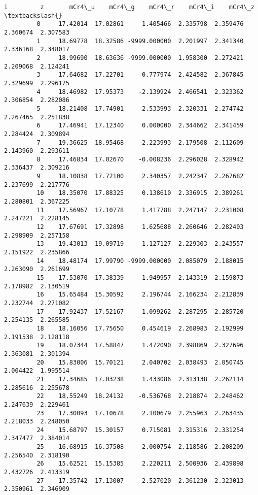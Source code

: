 \documentclass[11pt]{article}
\begin{document}
\begin{Verbatim}[commandchars=\\\{\}]
                      i         z       mCr4\_u    mCr4\_g    mCr4\_r    mCr4\_i    mCr4\_z  \textbackslash{}
         0     17.42014  17.02861     1.405466  2.335798  2.359476  2.360674  2.307583   
         1     18.69778  18.32586 -9999.000000  2.201997  2.341340  2.336168  2.348017   
         2     18.99690  18.63636 -9999.000000  1.958300  2.272421  2.209068  2.124241   
         3     17.64682  17.22701     0.777974  2.424582  2.367845  2.329699  2.296175   
         4     18.46982  17.95373    -2.139924  2.466541  2.323362  2.306854  2.282086   
         5     18.21408  17.74901     2.533993  2.320331  2.274742  2.267465  2.251838   
         6     17.46941  17.12340     0.000000  2.344662  2.341459  2.284424  2.309894   
         7     19.36625  18.95468     2.223993  2.179508  2.112609  2.143960  2.293611   
         8     17.46834  17.02670    -0.008236  2.296028  2.328942  2.336437  2.309216   
         9     18.10838  17.72100     2.340357  2.242347  2.267682  2.237699  2.217776   
         10    18.35070  17.88325     0.138610  2.336915  2.389261  2.280801  2.367225   
         11    17.56967  17.10778     1.417788  2.247147  2.231008  2.247221  2.228145   
         12    17.67691  17.32898     1.625688  2.260646  2.282403  2.298909  2.257158   
         13    19.43013  19.09719     1.127127  2.229303  2.243557  2.151922  2.235866   
         14    18.48174  17.99790 -9999.000000  2.085079  2.188015  2.263090  2.261699   
         15    17.53070  17.38339     1.949957  2.143319  2.159873  2.178982  2.130519   
         16    15.65484  15.30592     2.196744  2.166234  2.212839  2.232744  2.271082   
         17    17.92437  17.52167     1.099262  2.287295  2.285720  2.254135  2.265585   
         18    18.16056  17.75650     0.454619  2.268983  2.192999  2.191538  2.128118   
         19    18.07344  17.58847     1.472090  2.398869  2.327696  2.363081  2.301394   
         20    15.83006  15.70121     2.040702  2.038493  2.050745  2.004422  1.995514   
         21    17.34685  17.03238     1.433086  2.313138  2.262114  2.285616  2.255678   
         22    18.55249  18.24132    -0.536768  2.218874  2.248462  2.247639  2.229461   
         23    17.30093  17.10678     2.100679  2.255963  2.263435  2.218033  2.248050   
         24    15.68797  15.30157     0.715081  2.315316  2.331254  2.347477  2.384014   
         25    16.68915  16.37508     2.000754  2.118586  2.208209  2.256540  2.318190   
         26    15.62521  15.15385     2.220211  2.500936  2.439898  2.432726  2.413319   
         27    17.35742  17.13007     2.527020  2.361230  2.323013  2.350961  2.346909   

\end{Verbatim}
\end{document}
